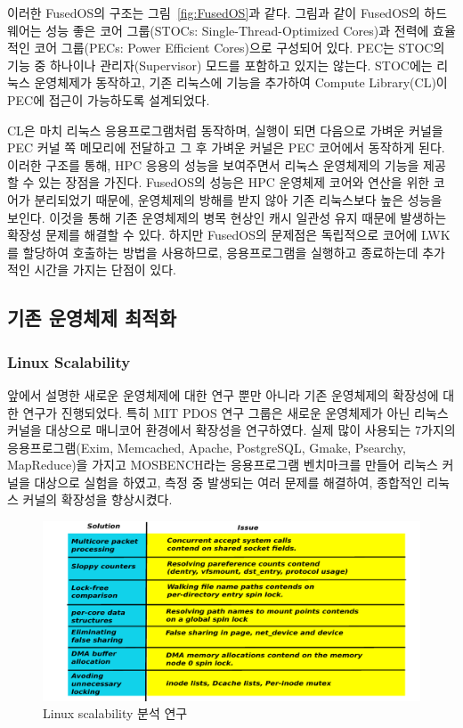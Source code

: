 이러한 FusedOS의 구조는 그림~\ref{fig:FusedOS}과 같다. 
그림과 같이 FusedOS의 하드웨어는 성능 좋은 코어 그룹(STOCs: Single-Thread-Optimized Cores)과
전력에 효율적인 코어 그룹(PECs: Power Efficient Cores)으로 구성되어 있다.
PEC는 STOC의 기능 중 하나이나 관리자(Supervisor) 모드를 포함하고 있지는 않는다. 
STOC에는 리눅스 운영체제가 동작하고, 기존 리눅스에 기능을 추가하여 Compute Library(CL)이 PEC에 
접근이 가능하도록 설계되었다.

CL은 마치 리눅스 응용프로그램처럼 동작하며, 실행이 되면 다음으로 가벼운 커널을 PEC 커널 쪽 메모리에 
전달하고 그 후 가벼운 커널은 PEC 코어에서 동작하게 된다.
이러한 구조를 통해, HPC 응용의 성능을 보여주면서 리눅스 운영체제의 기능을 제공할 수 있는 장점을 가진다. 
FusedOS의 성능은 HPC 운영체제 코어와 연산을 위한 코어가 분리되었기 때문에, 운영체제의 
방해를 받지 않아 기존 리눅스보다 높은 성능을 보인다.
이것을 통해 기존 운영체제의 병목 현상인 캐시 일관성 유지 때문에 발생하는 확장성 문제를 해결할 수 있다.
하지만 FusedOS의 문제점은 독립적으로 코어에 LWK를 할당하여 호출하는 방법을 사용하므로,  
응용프로그램을 실행하고 종료하는데 추가적인 시간을 가지는 단점이 있다.

\subsection{기존 운영체제 최적화}

\subsubsection{Linux Scalability}

앞에서 설명한 새로운 운영체제에 대한 연구 뿐만 아니라 기존 운영체제의 확장성에 대한 연구가 진행되었다. 
특히 MIT PDOS 연구 그룹은 새로운 운영체제가 아닌 리눅스 커널을 대상으로 매니코어 환경에서 확장성을 연구하였다.
실제 많이 사용되는 7가지의 응용프로그램(Exim, Memcached, Apache, PostgreSQL, Gmake, Psearchy,
MapReduce)을 가지고 MOSBENCH라는 응용프로그램 벤치마크를 만들어 리눅스 커널을 대상으로 실험을 
하였고, 측정 중 발생되는 여러 문제를 해결하여, 종합적인 리눅스 커널의 확장성을 향상시켰다.

\begin{figure}[h!]
    \centering
    \includegraphics[width=1\textwidth]{fig/linux/linux}
    \caption{Linux scalability 분석 연구}
  \label{fig:linux}
\end{figure}

